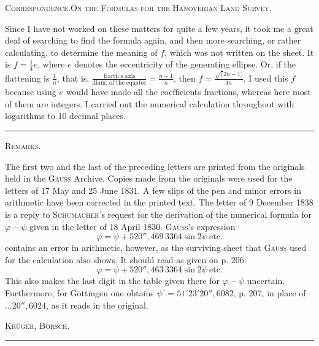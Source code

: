 \par\clearpage
{}\hfill{\footnotesize\textsc{Correspondence.\quad On the Formulas for the Hanoverian Land Survey.}}\par\medskip
Since I have not worked on these matters for quite a few years, it took me a great deal of searching to find the formula again, and then more searching, or rather calculating, to determine the meaning of \(f\), which was not written on the sheet. It is \(f=\frac14e\), where \(e\) denotes the eccentricity of the generating ellipse. Or, if the flattening is \(\frac1n\), that is, \(\frac{\text{Earth's axis}}{\text{diam. of the equator}}=\frac{n-1}n\), then \(f=\frac{\surd(2n-1)}{4n}\). I used this \(f\) because using \(e\) would have made all the coefficients fractions, whereas here most of them are integers. I carried out the numerical calculation throughout with logarithms to 10 decimal places.
\begin{center}\rule{3cm}{.4pt}\end{center}
\bigskip
\begin{center}\textsc{Remarks.}\end{center}
\begingroup\footnotesize
The first two and the last of the preceding letters are printed from the originals held in the \textsc{Gauss} Archive. Copies made from the originals were used for the letters of 17 May and 25 June 1831. A few slips of the pen and minor errors in arithmetic have been corrected in the printed text. The letter of 9 December 1838 is a reply to \textsc{Schumacher}'s request for the derivation of the numerical formula for \(\varphi-\psi\) given in the letter of 18 April 1830. \textsc{Gauss}'s expression
\[
\varphi=\psi+520''{,}469\,3364\sin2\psi\ \text{etc.}
\]
\noindent contains an error in arithmetic, however, as the surviving sheet that \textsc{Gauss} used for the calculation also shows. It should read as given on p. 206:
\[
\varphi=\psi+520''{,}463\,3364\sin2\psi\ \text{etc.}
\]
\noindent This also makes the last digit in the table given there for \(\varphi-\psi\) uncertain. Furthermore, for Göttingen one obtains \(\psi^\circ=51^\circ23'20''{,}6082\), p. 207, in place of \(\ldots20''{,}6024\), as it reads in the original.
\par\noindent\hfill\textsc{Krüger, Börsch.}\par
\endgroup
\vspace{1.8cm}\begin{center}\rule{4cm}{.4pt}\end{center}

